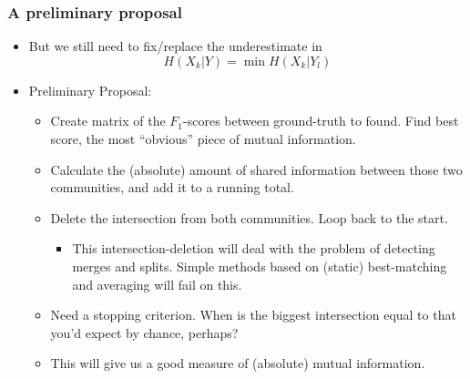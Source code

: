 \documentclass{beamer}
\newcommand{\subitem}[1]{\begin{itemize} \item #1 \end{itemize}}
\begin{document}
\frame
{
  \frametitle{ A preliminary proposal  }

  \begin{itemize}
	\item But we still need to fix/replace the underestimate in 
		\[
			H(X_k|Y) = \min H(X_k|Y_l)
		\]
	\item Preliminary Proposal:
  	\begin{itemize}
			\item Create matrix of the $F_1$-scores between ground-truth to found. Find best score, the most ``obvious'' piece of mutual information.
			\item Calculate the (absolute) amount of shared information between those two communities, and add it to a running total.
			\item Delete the intersection from both communities. Loop back to the start.
			\subitem{This intersection-deletion will deal with the problem of detecting merges and splits. Simple methods based on (static) best-matching and averaging will fail on this.}
			\item Need a stopping criterion. When is the biggest intersection equal to that you'd expect by chance, perhaps?
			\item This will give us a good measure of (absolute) mutual information. %
  	\end{itemize}
  \end{itemize}
}
\end{document}
